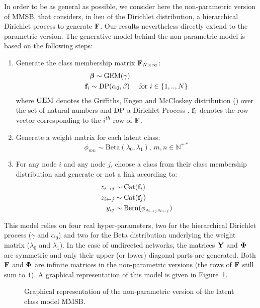 In order to be as general as possible, we consider here the non-parametric version of MMSB, that considers, in lieu of the Dirichlet distribution, a hierarchical Dirichlet process to generate $\mathbf{F}$. Our results nevertheless directly extend to the parametric version. The generative model behind the non-parametric model is based on the following steps:
%
\begin{enumerate}
\item Generate the class membership matrix $\mathbf{F}_{N \times \infty}$:
   \begin{align}
    &\bm{\beta} \sim \mathrm{GEM}(\gamma) \nonumber \\
    \mathbf{f}_i &\sim \mathrm{DP}(\alpha_0, \beta) \quad\textnormal{ for }  i \in \{1, .., N\} \nonumber
   \end{align}
where $\mathrm{GEM}$ denotes the Griffiths, Engen and McCloskey distribution (\cite{pitman2002pda}) over the set of natural numbers and $\mathrm{DP}$ a Dirichlet Process \cite{HDP}. $\mathbf{f}_i$ denotes the row vector corresponding to the $i^{th}$ row of $\mathbf{F}$.
\item Generate a weight matrix for each latent class:\\
\[ \phi_{mn} \sim \mathrm{Beta}(\lambda_0,\lambda_1), \, m,n \in \mathbb{N}^{+*} \]
\item For any node $i$ and any node $j$, choose a class from their class membership distribution and generate or not a link according to:
   \begin{align}
    z_{i \rightarrow j} &\sim \mbox{Cat}(\mathbf{f}_i) \nonumber \\
    z_{i \leftarrow j} &\sim \mbox{Cat}(\mathbf{f}_j) \nonumber \\
    y_{ij} &\sim \mathrm{Bern}(\phi_{z_{i \rightarrow j}z_{i \leftarrow j}})
    \label{eq:link-immsb}
   \end{align}
\end{enumerate}
%
This model relies on four real hyper-parameters, two for the hierarchical Dirichlet process ($\gamma$ and $\alpha_0$) and two for the Beta distribution underlying the weight matrix ($\lambda_0$ and $\lambda_1$). In the case of undirected networks, the matrices $\mathbf{Y}$ and $\mathbf{\Phi}$ are symmetric and only their upper (or lower) diagonal parts are generated. Both $\mathbf{F}$ and $\mathbf{\Phi}$ are infinite matrices in the non-parametric versions (the rows of $\mathbf{F}$ still sum to $1$). A graphical representation of this model is given in Figure~\ref{fig:mmsb}.


\begin{figure}[t]
	\centering
	\scalebox{0.88}{
		}
	\endminipage
	\caption{Graphical representation of the non-parametric version of the latent class model MMSB.}
	\label{fig:mmsb}
\end{figure}


